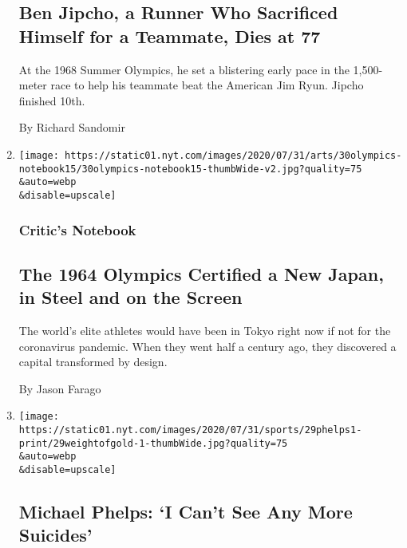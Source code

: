 \begin{enumerate}
  \hypertarget{ben-jipcho-a-runner-who-sacrificed-himself-for-a-teammate-dies-at-77}{%
  \subsection{Ben Jipcho, a Runner Who Sacrificed Himself for a
  Teammate, Dies at
  77}\label{ben-jipcho-a-runner-who-sacrificed-himself-for-a-teammate-dies-at-77}}

  At the 1968 Summer Olympics, he set a blistering early pace in the
  1,500-meter race to help his teammate beat the American Jim Ryun.
  Jipcho finished 10th.

  By Richard Sandomir
\item
  \href{/2020/07/30/arts/design/tokyo-olympics-1964-design.html}{}

  \texttt{[image: https://static01.nyt.com/images/2020/07/31/arts/30olympics-notebook15/30olympics-notebook15-thumbWide-v2.jpg?quality=75\\\&auto=webp\\\&disable=upscale]}

  \hypertarget{critics-notebook}{%
  \subsubsection{Critic's Notebook}\label{critics-notebook}}

  \hypertarget{the-1964-olympics-certified-a-new-japan-in-steel-and-on-the-screen}{%
  \subsection{The 1964 Olympics Certified a New Japan, in Steel and on
  the
  Screen}\label{the-1964-olympics-certified-a-new-japan-in-steel-and-on-the-screen}}

  The world's elite athletes would have been in Tokyo right now if not
  for the coronavirus pandemic. When they went half a century ago, they
  discovered a capital transformed by design.

  By Jason Farago
\item
  \href{/2020/07/29/sports/olympics/michael-phelps-documentary-weight-of-gold.html}{}

  \texttt{[image: https://static01.nyt.com/images/2020/07/31/sports/29phelps1-print/29weightofgold-1-thumbWide.jpg?quality=75\\\&auto=webp\\\&disable=upscale]}

  \hypertarget{michael-phelps-i-cant-see-any-more-suicides}{%
  \subsection{Michael Phelps: `I Can't See Any More
  Suicides'}\label{michael-phelps-i-cant-see-any-more-suicides}}


\end{enumerate}
